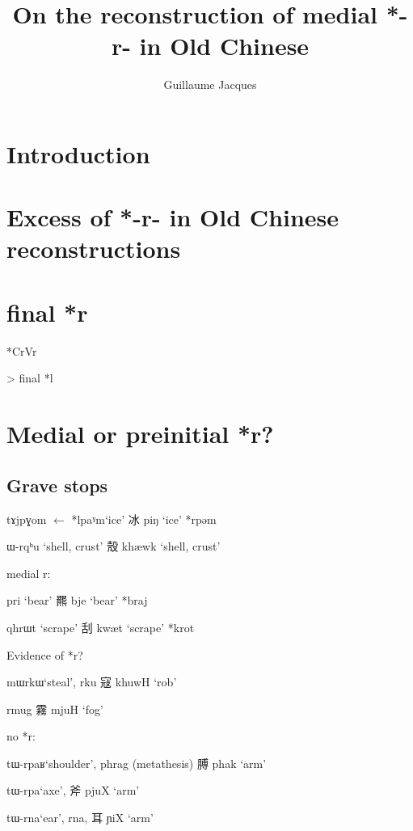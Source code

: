 \documentclass[oldfontcommands,oneside,a4paper,11pt]{article}
\newcommand{\ipa}[1]{{\phon \mbox{#1}}} %
\newcommand{\zh}[1]{{\cn #1}}
\newcommand{\ch}[3]{\zh{#1} \ipa{#2} `#3'}
\begin{document}
 
\title{On the reconstruction of medial *-r- in Old Chinese}
\author{Guillaume Jacques}
\maketitle
 

\section{Introduction}


\citet{handel02r}

\section{Excess of *-r- in Old Chinese reconstructions}

\section{final *r}
*CrVr

> final *\ipa{l}

\section{Medial or preinitial *r?}


\subsection{Grave stops}



\ipa{tɤjpɣom} $\leftarrow$ *\ipa{lpaˠm}`ice' \ch{冰}{piŋ}{ice} *\ipa{rpəm}

\ipa{ɯ-rqʰu} `shell, crust' \ch{殼}{khæwk}{shell, crust}




medial r:

\ipa{pri} `bear' \ch{羆}{bje}{bear} *braj

\ipa{qhrɯt} `scrape' \ch{刮}{kwæt}{scrape} *krot

Evidence of *r?

\ipa{mɯrkɯ}`steal', \ipa{rku} \ch{寇}{khuwH}{rob} 

rmug \ch{霧}{mjuH}{fog}


no *r:

\ipa{tɯ-rpaʁ}`shoulder', \ipa{phrag} (metathesis) \ch{膊}{phak}{arm}

\ipa{tɯ-rpa}`axe', \ch{斧}{pjuX}{arm}

\ipa{tɯ-rna}`ear', \ipa{rna}, \ch{耳}{ɲiX}{arm}
\end{document}
